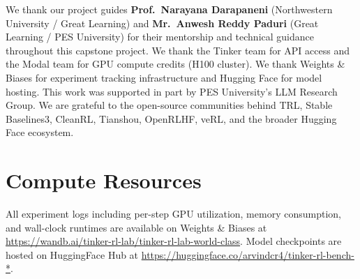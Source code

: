 \documentclass{article}
\begin{document}




\begin{ack}
\label{sec:acknowledgments}
We thank our project guides \textbf{Prof.~Narayana Darapaneni}
(Northwestern University / Great Learning) and
\textbf{Mr.~Anwesh Reddy Paduri} (Great Learning / PES University)
for their mentorship and technical guidance throughout this capstone project.
We thank the Tinker team for API access and the Modal team for GPU compute credits
(H100 cluster). We thank Weights \& Biases for experiment tracking infrastructure
and Hugging Face for model hosting. This work was supported in part by PES
University's LLM Research Group. We are grateful to the open-source communities
behind TRL, Stable Baselines3, CleanRL, Tianshou, OpenRLHF, veRL, and the
broader Hugging Face ecosystem.
\end{ack}





\appendix

\section{Compute Resources}
\label{app:compute}

All experiment logs including per-step GPU utilization, memory consumption,
and wall-clock runtimes are available on Weights \& Biases at
\url{https://wandb.ai/tinker-rl-lab/tinker-rl-lab-world-class}.
Model checkpoints are hosted on HuggingFace Hub at
\url{https://huggingface.co/arvindcr4/tinker-rl-bench-*}.
\end{document}
